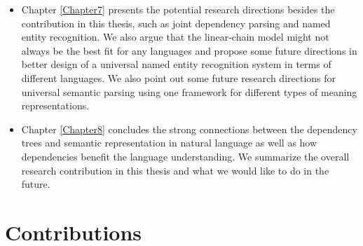 \begin{itemize}
	
	\item Chapter \ref{Chapter7} presents the potential research directions besides the contribution in this thesis, such as joint dependency parsing and named entity recognition.
	We also argue that the linear-chain model might not always be the best fit for any languages and propose some future directions in better design of a universal named entity recognition system in terms of different languages.
	We  also point out some future research directions for universal semantic parsing using one framework for different types of meaning representations. 
	
	\item Chapter \ref{Chapter8} concludes the strong connections between the dependency trees and semantic representation
	 in natural language as well as how dependencies benefit the language understanding.
	We summarize the overall research contribution in this thesis and what we would like to do in the future.
\end{itemize}


\section{Contributions}

